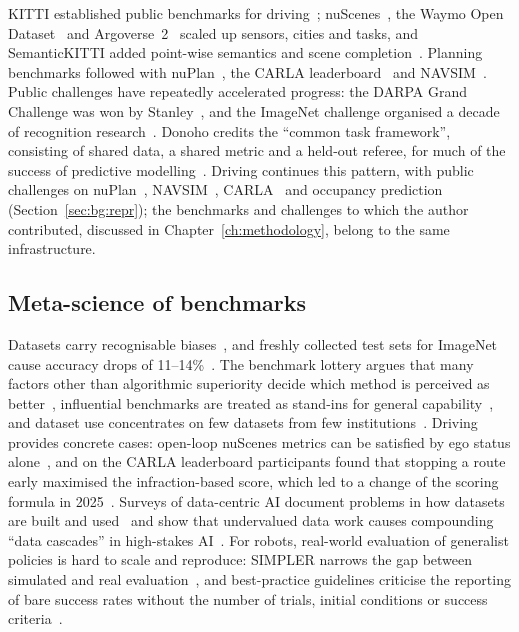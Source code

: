 KITTI established public benchmarks for driving~\cite{geiger2012kitti}; nuScenes~\cite{caesar2020nuscenes}, the Waymo Open Dataset~\cite{sun2020waymo} and Argoverse~2~\cite{wilson2021argoverse2} scaled up sensors, cities and tasks, and SemanticKITTI added point-wise semantics and scene completion~\cite{behley2019semantickitti}. Planning benchmarks followed with nuPlan~\cite{karnchanachari2024nuplan}, the CARLA leaderboard~\cite{carla2025leaderboard} and NAVSIM~\cite{dauner2024navsim}. Public challenges have repeatedly accelerated progress: the DARPA Grand Challenge was won by Stanley~\cite{thrun2006stanley}, and the ImageNet challenge organised a decade of recognition research~\cite{russakovsky2015ilsvrc}. Donoho credits the ``common task framework'', consisting of shared data, a shared metric and a held-out referee, for much of the success of predictive modelling~\cite{donoho2017fifty}. Driving continues this pattern, with public challenges on nuPlan~\cite{dauner2023parting}, NAVSIM~\cite{dauner2024navsim}, CARLA~\cite{renz2025simlingo} and occupancy prediction (Section~\ref{sec:bg:repr}); the benchmarks and challenges to which the author contributed, discussed in Chapter~\ref{ch:methodology}, belong to the same infrastructure.

\subsection{Meta-science of benchmarks}

Datasets carry recognisable biases~\cite{torralba2011unbiased}, and freshly collected test sets for ImageNet cause accuracy drops of 11--14\%~\cite{recht2019imagenet}. The benchmark lottery argues that many factors other than algorithmic superiority decide which method is perceived as better~\cite{dehghani2021benchmark}, influential benchmarks are treated as stand-ins for general capability~\cite{raji2021everything}, and dataset use concentrates on few datasets from few institutions~\cite{koch2021reduced}. Driving provides concrete cases: open-loop nuScenes metrics can be satisfied by ego status alone~\cite{zhai2023rethinking,li2024ego}, and on the CARLA leaderboard participants found that stopping a route early maximised the infraction-based score, which led to a change of the scoring formula in 2025~\cite{carla2025leaderboard}. Surveys of data-centric AI document problems in how datasets are built and used~\cite{paullada2021data,zha2025datacentric} and show that undervalued data work causes compounding ``data cascades'' in high-stakes AI~\cite{sambasivan2021everyone}. For robots, real-world evaluation of generalist policies is hard to scale and reproduce: SIMPLER narrows the gap between simulated and real evaluation~\cite{li2024simpler}, and best-practice guidelines criticise the reporting of bare success rates without the number of trials, initial conditions or success criteria~\cite{kressgazit2024robot}.

